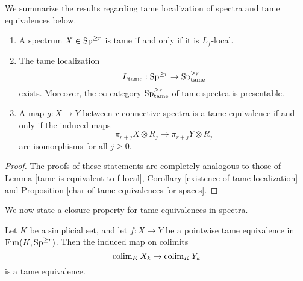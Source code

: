 We
summarize the results regarding tame localization of spectra and tame equivalences below. 

\begin{proposition}
        \begin{enumerate}
            \item A spectrum $X\in \operatorname{Sp}^{\geq r}$ is tame if and only if it is $L_f$-local.
            \item The tame localization
$$
L_{\operatorname{\operatorname{tame}}}: \operatorname{Sp}^{\geq r} \to \operatorname{Sp}^{\geq r}_{\operatorname{\operatorname{tame}}}
$$
exists. Moreover, the $\infty$-category $\operatorname{Sp}^{\geq r}_{\operatorname{\operatorname{tame}}}$ of tame spectra is presentable.
\item  A map $g: X\to Y$ between $r$-connective spectra is a tame equivalence if and only if the induced maps
        $$
        \pi_{r+j}X \otimes R_{j} 
        \to
        \pi_{r+j}Y \otimes R_{j}
        $$
        are isomorphisms for all $j\geq 0$.
        \end{enumerate}
\end{proposition}
\begin{proof}
    The proofs of these statements are completely analogous to those of Lemma \ref{tame is equivalent to f-local}, Corollary \ref{existence of tame localization} and Proposition \ref{char of tame equivalences for spaces}.
    
\end{proof}
We now state a closure property for tame equivalences in spectra.
\begin{lemma}
\label{closure property of tame equivalences}

		Let $K$ be a simplicial set, and let $f:X\to Y$ be a pointwise tame equivalence in $\operatorname{Fun}(K,\operatorname{Sp}^{\geq r})$.
	Then the induced map on colimits 
		$$
		\operatorname{colim}_{K}X_k \to \operatorname{colim}_{K}Y_k
		$$ is a tame equivalence.
		

\end{lemma}

